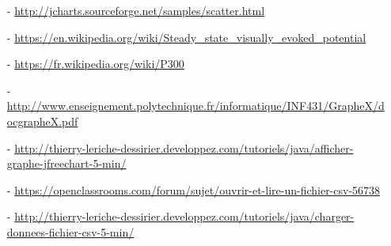 \begin{itemize}
  	\item [-] \url{http://jcharts.sourceforge.net/samples/scatter.html}
  	\item [-] \url{https://en.wikipedia.org/wiki/Steady_state_visually_evoked_potential}
  	\item [-] \url{https://fr.wikipedia.org/wiki/P300}
  	\item [-] \url{http://www.enseignement.polytechnique.fr/informatique/INF431/GrapheX/docgrapheX.pdf}
  	\item [-] \url{http://thierry-leriche-dessirier.developpez.com/tutoriels/java/afficher-graphe-jfreechart-5-min/}
  	\item [-] \url{https://openclassrooms.com/forum/sujet/ouvrir-et-lire-un-fichier-csv-56738}
  	\item [-] \url{http://thierry-leriche-dessirier.developpez.com/tutoriels/java/charger-donnees-fichier-csv-5-min/}
  \end{itemize}
